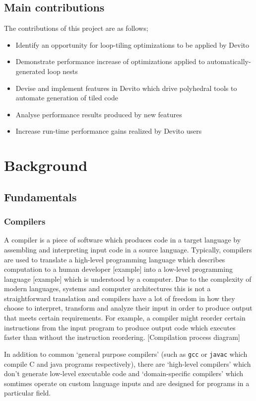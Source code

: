 \documentclass[a4paper,12pt,twoside]{report}
\begin{document}
\section{Main contributions}
The contributions of this project are as follows;
\begin{itemize}
	\item{Identify an opportunity for loop-tiling optimizations to be applied by Devito}
	\item{Demonstrate performance increase of optimizations applied to automatically-generated loop nests}
	\item{Devise and implement features in Devito which drive polyhedral tools to automate generation of tiled code}
	\item{Analyse performance results produced by new features}
	\item{Increase run-time performance gains realized by Devito users}
\end{itemize}

\chapter{Background}

\section{Fundamentals}
\subsection{Compilers}
A compiler is a piece of software which produces code in a target language by assembling and interpreting input code in a source language.
Typically, compilers are used to translate a high-level programming language which describes computation to a human developer [example] into 
a low-level programming language [example] which is understood by a computer. Due to the complexity of modern languages, systems and computer
architectures this is not a straightforward translation and compilers have a lot of freedom in how they choose to interpret, transform and analyze
their input in order to produce output that meets certain requirements. For example, a compiler might reorder certain instructions from the input
program to produce output code which executes faster than without the instruction reordering.
[Compilation process diagram]

In addition to common `general purpose compilers' (such as \texttt{gcc} or \texttt{javac} which compile C and java programs respectively),
there are `high-level compilers' which don't generate low-level executable code and `domain-specific compilers' which somtimes operate on
custom language inputs and are designed for programs in a particular field.
\end{document}
